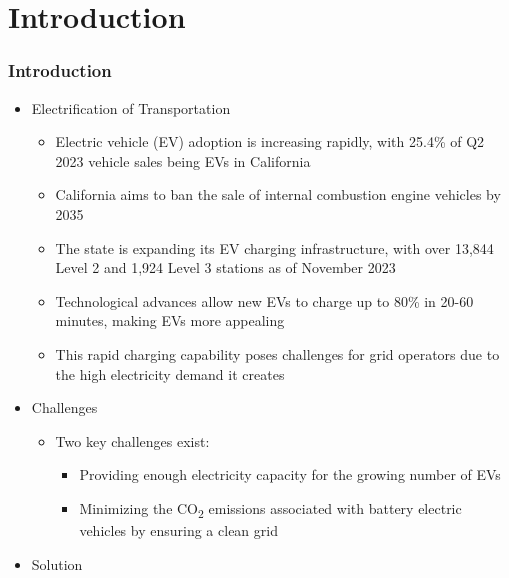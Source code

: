 \documentclass[aspectratio=169, 8 pt]{beamer}
\begin{document}
\section{Introduction}
	\begin{frame}
		\frametitle{Introduction}	
		\begin{itemize} \large
			\item Electrification of Transportation
				\begin{itemize} 
					\item Electric vehicle (EV) adoption is increasing rapidly, with 25.4\% of Q2 2023 vehicle sales being EVs in California
					\item California aims to ban the sale of internal combustion engine vehicles by 2035
					\item The state is expanding its EV charging infrastructure, with over 13,844 Level 2 and 1,924 Level 3 stations as of November 2023
					\item Technological advances allow new EVs to charge up to 80\% in 20-60 minutes, making EVs more appealing
					\item This rapid charging capability poses challenges for grid operators due to the high electricity demand it creates
				\end{itemize}
			\item Challenges
				\begin{itemize} 
					\item Two key challenges exist: 
					\begin{itemize} 
						\item Providing enough electricity capacity for the growing number of EVs
						\item Minimizing the CO\textsubscript{2} emissions associated with battery electric vehicles by ensuring a clean grid
					\end{itemize}
				\end{itemize}
			\item Solution
				\begin{itemize} 

\end{itemize}
\end{itemize}
\end{frame}
\end{document}
